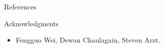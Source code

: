 \documentclass[final,hyperref={pdfpagelabels=false}]{beamer}
\begin{document}
\begin{frame}[t]
\begin{columns}[t]
\begin{column}{.465\textwidth}
\begin{block}{References}

\end{block}


\begin{block}{Acknowledgments}

\begin{itemize}
\item Fengguo Wei, Dewan Chaulagain, Steven Arzt. 
\end{itemize}
\end{block}

\end{column} %

\begin{column}{.015\textwidth}\end{column} %

\end{columns} %

\end{frame} %
\end{document}

